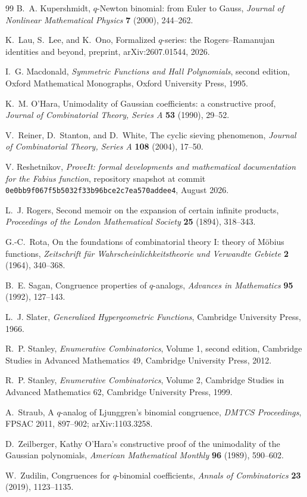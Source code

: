\documentclass[11pt,oneside,openany]{book}
\theoremstyle{definition}
\theoremstyle{remark}
\begin{document}
\begin{thebibliography}{99}
B.~A. Kupershmidt,
$q$-Newton binomial: from Euler to Gauss,
\emph{Journal of Nonlinear Mathematical Physics} \textbf{7} (2000), 244--262.

K.~Lau, S.~Lee, and K.~Ono,
Formalized $q$-series: the Rogers--Ramanujan identities and beyond,
preprint, arXiv:2607.01544, 2026.

I.~G. Macdonald,
\emph{Symmetric Functions and Hall Polynomials}, second edition,
Oxford Mathematical Monographs, Oxford University Press, 1995.

K.~M. O'Hara,
Unimodality of Gaussian coefficients: a constructive proof,
\emph{Journal of Combinatorial Theory, Series A} \textbf{53} (1990), 29--52.

V.~Reiner, D.~Stanton, and D.~White,
The cyclic sieving phenomenon,
\emph{Journal of Combinatorial Theory, Series A} \textbf{108} (2004), 17--50.

V. Reshetnikov,
\emph{ProveIt: formal developments and mathematical documentation for the Fabius function},
repository snapshot at commit
\texttt{0e0bb9f067f5b5032f33b96bce2c7ea570addee4}, August 2026.

L.~J. Rogers,
Second memoir on the expansion of certain infinite products,
\emph{Proceedings of the London Mathematical Society} \textbf{25} (1894), 318--343.

G.-C.~Rota,
On the foundations of combinatorial theory I: theory of M\"obius functions,
\emph{Zeitschrift f\"ur Wahrscheinlichkeitstheorie und Verwandte Gebiete} \textbf{2} (1964), 340--368.

B.~E. Sagan,
Congruence properties of $q$-analogs,
\emph{Advances in Mathematics} \textbf{95} (1992), 127--143.

L.~J. Slater,
\emph{Generalized Hypergeometric Functions},
Cambridge University Press, 1966.

R.~P. Stanley,
\emph{Enumerative Combinatorics}, Volume 1, second edition,
Cambridge Studies in Advanced Mathematics 49, Cambridge University Press, 2012.

R.~P. Stanley,
\emph{Enumerative Combinatorics}, Volume 2,
Cambridge Studies in Advanced Mathematics 62, Cambridge University Press, 1999.

A.~Straub,
A $q$-analog of Ljunggren's binomial congruence,
\emph{DMTCS Proceedings}, FPSAC 2011, 897--902; arXiv:1103.3258.

D.~Zeilberger,
Kathy O'Hara's constructive proof of the unimodality of the Gaussian polynomials,
\emph{American Mathematical Monthly} \textbf{96} (1989), 590--602.

W.~Zudilin,
Congruences for $q$-binomial coefficients,
\emph{Annals of Combinatorics} \textbf{23} (2019), 1123--1135.

\end{thebibliography}

\printindex
\end{document}
